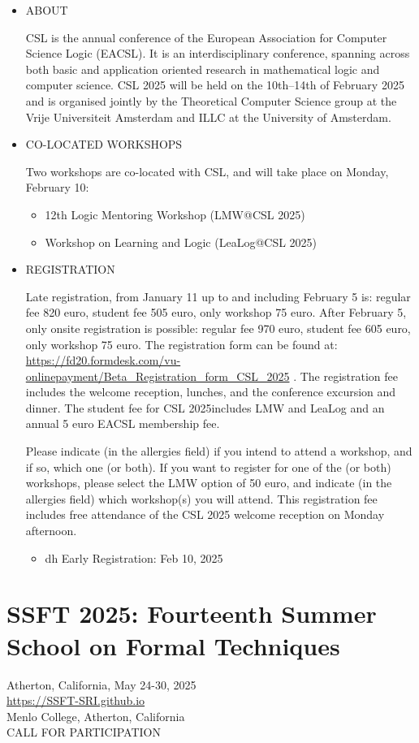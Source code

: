 \documentclass[prodmode,acmtecs]{acmsmall} %
\begin{document}
\begin{itemize}\item  ABOUT  
 
  CSL is the annual conference of the European Association for Computer Science Logic (EACSL). It is an interdisciplinary conference, spanning across both basic and application oriented research in mathematical logic and computer science. CSL 2025 will be held on the 10th–14th of February 2025 and is organised jointly by the Theoretical Computer Science group at the Vrije Universiteit Amsterdam and ILLC at the University of Amsterdam. 
 
\item  CO-LOCATED WORKSHOPS  
 
  Two workshops are co-located with CSL, and will take place on Monday, February 10: 
 
\begin{itemize}\item  12th Logic Mentoring Workshop (LMW@CSL 2025)
\item  Workshop on Learning and Logic (LeaLog@CSL 2025)
\end{itemize} 
\item  REGISTRATION  
 
  Late registration, from January 11 up to and including February 5 is: regular fee 820 euro, student fee 505 euro, only workshop 75 euro. After February 5, only onsite registration is possible: regular fee 970 euro, student fee 605 euro, only workshop 75 euro. The registration form can be found at: \href{https://fd20.formdesk.com/vu-onlinepayment/Beta_Registration_form_CSL_2025}{https://fd20.formdesk.com/vu-onlinepayment/Beta\_Registration\_form\_CSL\_2025} . The registration fee includes the welcome reception, lunches, and the conference excursion and dinner. The student fee for CSL 2025includes LMW and LeaLog and an annual 5 euro EACSL membership fee. 
 
  Please indicate (in the allergies field) if you intend to attend a workshop, and if so, which one (or both). If you want to register for one of the (or both) workshops, please select the LMW option of 50 euro, and indicate (in the allergies field) which workshop(s) you will attend. This registration fee includes free attendance of the CSL 2025 welcome reception on Monday afternoon. 
 
\begin{itemize}\item  dh Early Registration: Feb 10, 2025
\end{itemize} 
\end{itemize}\section{SSFT 2025: Fourteenth Summer School on Formal Techniques}\label{SSFT2025}  Atherton, California, May 24-30, 2025\\ 
  \href{https://SSFT-SRI.github.io}{https://SSFT-SRI.github.io}\\ 
  Menlo College, Atherton, California\\ 
CALL FOR PARTICIPATION 
\end{document}
